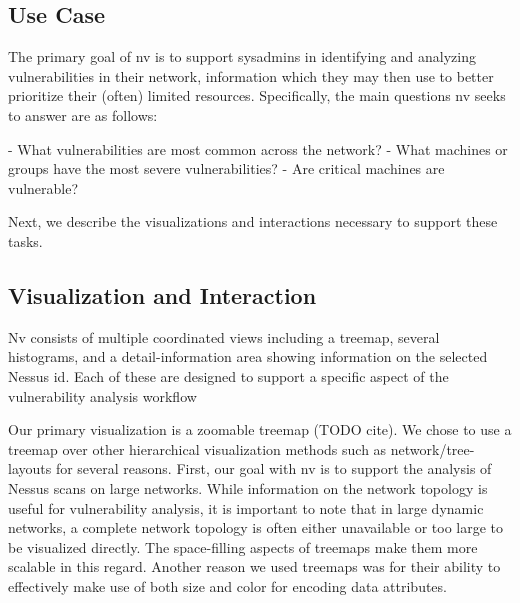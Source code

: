 \documentclass{acm_proc_article-sp}
\begin{document}

\subsection{Use Case}
The primary goal of nv is to support sysadmins in identifying and analyzing vulnerabilities in their network, information which they may then use to better prioritize their (often) limited resources.
Specifically, the main questions nv seeks to answer are as follows:

- What vulnerabilities are most common across the network?
- What machines or groups have the most severe vulnerabilities?
- Are critical machines are vulnerable?

Next, we describe the visualizations and interactions necessary to support these tasks.

\subsection{Visualization and Interaction}
Nv consists of multiple coordinated views including a treemap, several histograms, and a detail-information area showing information on the selected Nessus id.
Each of these are designed to support a specific aspect of the vulnerability analysis workflow

Our primary visualization is a zoomable treemap (TODO cite).
We chose to use a treemap over other hierarchical visualization methods such as network/tree-layouts for several reasons.
First, our goal with nv is to support the analysis of Nessus scans on large networks.
While information on the network topology is useful for vulnerability analysis, it is important to note that in large dynamic networks, a complete network topology is often either unavailable or too large to be visualized directly.
The space-filling aspects of treemaps make them more scalable in this regard.
Another reason we used treemaps was for their ability to effectively make use of both size and color for encoding data attributes.
\end{document}
